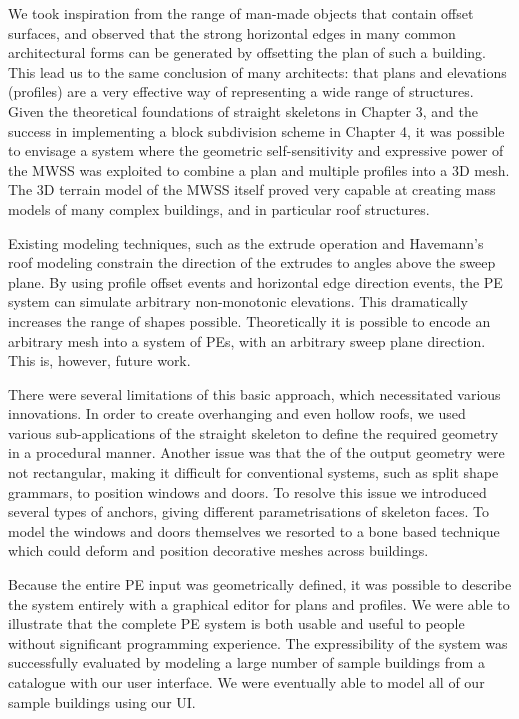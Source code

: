 We took inspiration from the range of man-made objects that contain offset surfaces, and observed that the strong horizontal edges in many common architectural forms can be generated by offsetting the plan of such a building. This lead us to the same conclusion of many architects: that plans and elevations (profiles) are a very effective way of representing a wide range of structures. Given the theoretical foundations of straight skeletons in Chapter 3, and the success in implementing a block subdivision scheme in Chapter 4, it was possible to envisage a system where the geometric self-sensitivity and expressive power of the MWSS was exploited to combine a plan and multiple profiles into a 3D mesh. The 3D terrain model of the MWSS itself proved very capable at creating mass models of many complex buildings, and in particular roof structures.

Existing modeling techniques, such as the extrude operation and Havemann's\cite{Havemann:2005:GMM} roof modeling constrain the direction of the extrudes to angles above the sweep plane. By using profile offset events and horizontal edge direction events, the PE system can simulate arbitrary non-monotonic elevations. This dramatically increases the range of shapes possible. Theoretically it is possible to encode an arbitrary mesh into a system of PEs, with an arbitrary sweep plane direction. This is, however, future work.

There were several limitations of this basic approach, which necessitated various innovations. In order to create overhanging and even hollow roofs, we used various sub-applications of the straight skeleton to define the required geometry in a procedural manner. Another issue was that the \facades{} of the output geometry were not rectangular, making it difficult for conventional systems, such as split shape grammars, to position windows and doors. To resolve this issue we introduced several types of anchors, giving different parametrisations of skeleton faces. To model the windows and doors themselves we resorted to a bone based technique which could deform and position decorative meshes across buildings.

Because the entire PE input was geometrically defined, it was possible to describe the system entirely with a graphical editor for plans and profiles. We were able to illustrate that the complete PE system is both usable and useful to people without significant programming experience. The expressibility of the system was successfully evaluated by modeling a large number of sample buildings from a catalogue with our user interface. We were eventually able to model all of our sample buildings using our UI.

